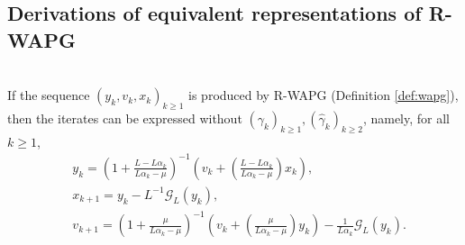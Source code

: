\documentclass[12pt]{article}
\begin{document}
    \subsection{Derivations of equivalent representations of R-WAPG}
        \begin{proposition}\label{prop:wapg-first-equivalent-repr}\;\\
            If the sequence $(y_k, v_k, x_k)_{k \ge 1}$ is produced by R-WAPG (Definition \ref{def:wapg}),
            then the iterates can be expressed without $(\gamma_k)_{k \ge1},(\hat \gamma_k)_{k \ge 2}$,  namely, for all $k\ge 1$,
            \begin{align}
                & y_{k} =
                \left(
                    1 + \frac{L - L\alpha_{k}}{L\alpha_{k} - \mu}
                \right)^{-1}
                \left(
                    v_{k} +
                    \left(\frac{L - L\alpha_{k}}{L\alpha_{k} - \mu} \right) x_{k}
                \right), \label{eqn:rwapg-first-equiv-form-eqn-1}
                \\
                & x_{k + 1} =
                y_k - L^{-1} \mathcal G_L (y_k),
                \\
                & v_{k + 1} =
                \left(
                    1 + \frac{\mu}{L \alpha_k - \mu}
                \right)^{-1}
                \left(
                    v_k +
                    \left(\frac{\mu}{L \alpha_k - \mu}\right) y_k
                \right) - \frac{1}{L\alpha_{k}}\mathcal G_L (y_k).
                \label{eqn:rwapg-first-equiv-form-eqn-2}
            \end{align}
        \end{proposition}
\end{document}
